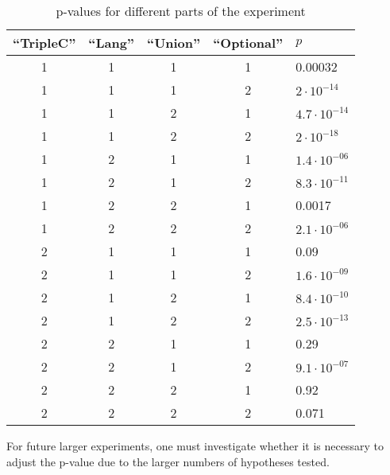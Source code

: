 \documentclass{llncs}
\begin{document}
\begin{table}[ht]
\begin{center}
\caption{p-values for different parts of the experiment}\label{tab:pvaluesfull}
\begin{tabular}{ccccl}
  \hline
``TripleC'' & ``Lang'' & ``Union'' & ``Optional'' & $p$ \\ 
  \hline
  1 & 1 & 1 & 1 & 0.00032 \\ 
  1 & 1 & 1 & 2 & $2 \cdot 10^{-14}$ \\ 
  1 & 1 & 2 & 1 & $4.7 \cdot 10^{-14}$ \\ 
  1 & 1 & 2 & 2 & $2 \cdot 10^{-18}$ \\ 
  1 & 2 & 1 & 1 & $1.4 \cdot 10^{-06}$ \\ 
  1 & 2 & 1 & 2 & $8.3 \cdot 10^{-11}$ \\ 
  1 & 2 & 2 & 1 & 0.0017 \\ 
  1 & 2 & 2 & 2 & $2.1 \cdot 10^{-06}$ \\ 
  2 & 1 & 1 & 1 & 0.09 \\ 
  2 & 1 & 1 & 2 & $1.6 \cdot 10^{-09}$ \\ 
  2 & 1 & 2 & 1 & $8.4 \cdot 10^{-10}$ \\ 
  2 & 1 & 2 & 2 & $2.5 \cdot 10^{-13}$ \\ 
  2 & 2 & 1 & 1 & 0.29 \\ 
  2 & 2 & 1 & 2 & $9.1 \cdot 10^{-07}$ \\ 
  2 & 2 & 2 & 1 & 0.92 \\ 
  2 & 2 & 2 & 2 & 0.071 \\ 
   \hline
\end{tabular}
\end{center}
\end{table}


For future larger experiments, one must investigate whether it is
necessary to adjust the p-value due to the larger numbers of
hypotheses tested.
\end{document}

